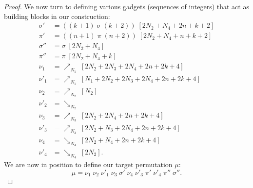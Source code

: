 \documentclass[a4paper,10pt]{llncs}
\begin{document}
\begin{proof}
  We now turn to defining various gadgets (sequences of integers)
  that act as building blocks in our construction:
  \begin{align*}
  \sigma'  &= ((k+1) \; \sigma \; (k+2)) \; [2N_2 + N_4 + 2n + k + 2] \\
  \pi'     &= ((n+1) \; \pi \; (n+2)) \; [2N_2 + N_4 + n + k + 2] \\
  \sigma'' &= \sigma \; [2N_2 + N_4] \\
  \pi''    &= \pi \; [2N_2 + N_4 + k] \\
  \nu_1    &= \nearrow_{N_1} \; [2N_2 + 2N_3 + 2N_4 + 2n + 2k + 4] \\
  \nu'_1   &= \nearrow_{N_1} \; [N_1 + 2N_2 + 2N_3 + 2N_4 + 2n + 2k + 4] \\
  \nu_2    &= \nearrow_{N_2} \; [N_2] \\
  \nu'_2   &= \searrow_{N_2} \\
  \nu_3    &= \nearrow_{N_3} \; [2N_2 + 2N_4 + 2n + 2k + 4] \\
  \nu'_3   &= \nearrow_{N_3} \; [2N_2 + N_3 + 2N_4 + 2n + 2k + 4] \\
  \nu_4    &= \searrow_{N_4} \; [2N_2 + N_4 + 2n + 2k + 4] \\
  \nu'_4   &= \searrow_{N_4} \; [2N_2]\text{.}
  \end{align*}
  We are now in position to define our target permutation $\mu$:
  $$
  \mu
  =
  \nu_1 \; \nu_2 \; \nu'_1 \; \nu_3 \; \sigma' \; \nu_4 \; \nu'_3 \; \pi' \; \nu'_4 \; \pi'' \; \sigma''
  \text{.}
  $$


\end{proof}
\end{document}
